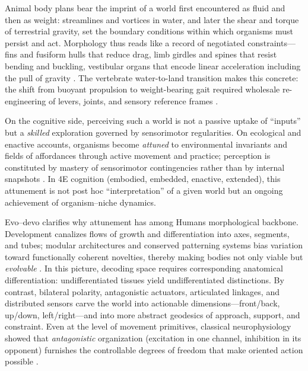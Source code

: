 Animal body plans bear the imprint of a world first encountered as fluid and then as weight: streamlines and vortices in water, and later the shear and torque of terrestrial gravity, set the boundary conditions within which organisms must persist and act. Morphology thus reads like a record of negotiated constraints---fins and fusiform hulls that reduce drag, limb girdles and spines that resist bending and buckling, vestibular organs that encode linear acceleration including the pull of gravity \citep{lighthill1975mathematical,vogel1996life,angelaki2008vestibular}. The vertebrate water-to-land transition makes this concrete: the shift from buoyant propulsion to weight-bearing gait required wholesale re-engineering of levers, joints, and sensory reference frames \citep{clack2012gaining}.

On the cognitive side, perceiving such a world is not a passive uptake of “inputs” but a \emph{skilled} exploration governed by sensorimotor regularities. On ecological and enactive accounts, organisms become \emph{attuned} to environmental invariants and fields of affordances through active movement and practice; perception is constituted by mastery of sensorimotor contingencies rather than by internal snapshots \citep{gibson1979ecological,oregan2001sensorimotor,noe2004action,chemero2009radical,rietveld2014rich,gallagher2023-book}. In 4E cognition (embodied, embedded, enactive, extended), this attunement is not post hoc “interpretation” of a given world but an ongoing achievement of organism–niche dynamics.

Evo–devo clarifies why attunement has among Humans morphological backbone. Development canalizes flows of growth and differentiation into axes, segments, and tubes; modular architectures and conserved patterning systems bias variation toward functionally coherent novelties, thereby making bodies not only viable but \emph{evolvable} \citep{maynardsmith1985developmental,west-eberhard2003developmental,wagner1996evolvability,carroll2008evodevo}. In this picture, decoding space requires corresponding anatomical differentiation: undifferentiated tissues yield undifferentiated distinctions. By contrast, bilateral polarity, antagonistic actuators, articulated linkages, and distributed sensors carve the world into actionable dimensions—front/back, up/down, left/right—and into more abstract geodesics of approach, support, and constraint. Even at the level of movement primitives, classical neurophysiology showed that \emph{antagonistic} organization (excitation in one channel, inhibition in its opponent) furnishes the controllable degrees of freedom that make oriented action possible \citep{sherrington1906integrative,sherrington1905reciprocal}.

